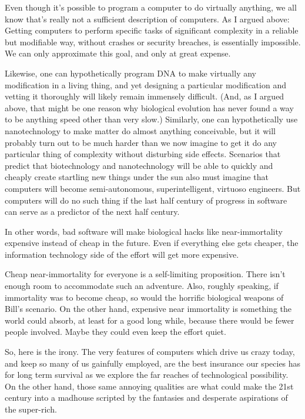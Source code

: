 \documentclass[letterpaper,12pt,english]{sphinxmanual}
\begin{document}
Even though it's possible to program a computer to do virtually anything, we all know that's really not a sufficient description of computers. As I argued above: Getting computers to perform specific tasks of significant complexity in a reliable but modifiable way, without crashes or security breaches, is essentially impossible. We can only approximate this goal, and only at great expense.

Likewise, one can hypothetically program DNA to make virtually any modification in a living thing, and yet designing a particular modification and vetting it thoroughly will likely remain immensely difficult. (And, as I argued above, that might be one reason why biological evolution has never found a way to be anything speed other than very slow.) Similarly, one can hypothetically use nanotechnology to make matter do almost anything conceivable, but it will probably turn out to be much harder than we now imagine to get it do any particular thing of complexity without disturbing side effects. Scenarios that predict that biotechnology and nanotechnology will be able to quickly and cheaply create startling new things under the sun also must imagine that computers will become semi-autonomous, superintelligent, virtuoso engineers. But computers will do no such thing if the last half century of progress in software can serve as a predictor of the next half century.

In other words, bad software will make biological hacks like near-immortality expensive instead of cheap in the future. Even if everything else gets cheaper, the information technology side of the effort will get more expensive.

Cheap near-immortality for everyone is a self-limiting proposition. There isn't enough room to accommodate such an adventure. Also, roughly speaking, if immortality was to become cheap, so would the horrific biological weapons of Bill's scenario. On the other hand, expensive near immortality is something the world could absorb, at least for a good long while, because there would be fewer people involved. Maybe they could even keep the effort quiet.

So, here is the irony. The very features of computers which drive us crazy today, and keep so many of us gainfully employed, are the best insurance our species has for long term survival as we explore the far reaches of technological possibility. On the other hand, those same annoying qualities are what could make the 21st century into a madhouse scripted by the fantasies and desperate aspirations of the super-rich.
\end{document}
